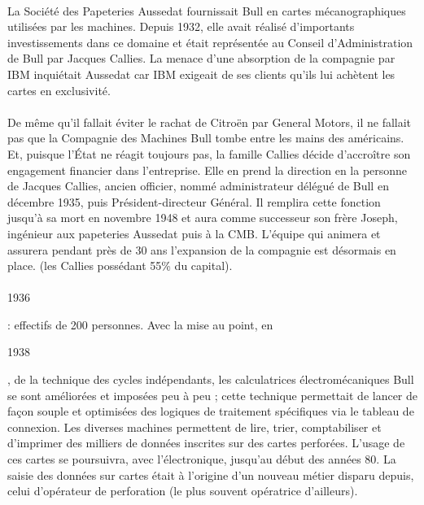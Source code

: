 \documentclass[11pt]{article}
\begin{document}
		\paragraph{}
		La Société des Papeteries Aussedat fournissait Bull en cartes mécanographiques utilisées par les machines. Depuis 
		1932, elle avait réalisé d'importants investissements dans ce domaine et était représentée au Conseil d'Administration 
		de Bull par Jacques Callies. La menace d'une absorption de la compagnie par IBM inquiétait Aussedat car IBM exigeait 
		de ses clients qu'ils lui achètent les cartes en exclusivité.
		\paragraph{}
		De même qu'il fallait éviter le rachat de Citroën par General Motors, il ne fallait pas que la Compagnie des Machines 
		Bull tombe entre les mains des américains. Et, puisque l'État ne réagit toujours pas, la famille Callies décide 
		d'accroître son engagement financier dans l'entreprise. Elle en prend la direction en la personne de Jacques Callies, 
		ancien officier, nommé administrateur délégué de Bull en décembre 1935, puis Président-directeur Général. Il remplira 
		cette fonction jusqu'à sa mort en novembre 1948 et aura comme successeur son frère Joseph, ingénieur aux papeteries 
		Aussedat puis à la CMB. L'équipe qui animera et assurera pendant près de 30 ans l'expansion de la compagnie est 
		désormais en place. (les Callies possédant 55\% du capital).
		\paragraph{}
		\begin{bf}1936\end{bf}: effectifs de 200 personnes.\newline{}
		Avec la mise au point, en \begin{bf}1938\end{bf}, de la technique des cycles indépendants, les calculatrices 
		électromécaniques Bull se sont améliorées et imposées peu à peu ; cette technique permettait de lancer de façon souple 
		et optimisées des logiques de traitement spécifiques via le tableau de connexion. Les diverses machines permettent de 
		lire, trier, comptabiliser et d’imprimer des milliers de données inscrites sur des cartes perforées. L’usage de ces 
		cartes se poursuivra, avec l’électronique, jusqu’au début des années 80. La saisie des données sur cartes était à 
		l’origine d’un nouveau métier disparu depuis, celui d’opérateur de perforation (le plus souvent opératrice d’ailleurs).
\end{document}
